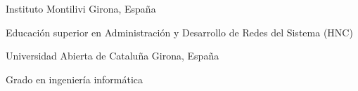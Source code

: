 \documentclass[]{awesome-cv}
\begin{document}
\vspace{8mm}
\begin{cventries}
	\vspace{2mm}
	\cventry
	{}
	{Instituto Montilivi \vspace{-5mm}}
	{Girona, España \vspace{-5mm}}
	{}
	{\begin{cvsectionnormaltext} 
		\item{Educación superior en Administración y Desarrollo de Redes del Sistema (HNC)}
	\end{cvsectionnormaltext}}

 \cventry
	{}
	{Universidad Abierta de Cataluña \vspace{-5mm}}
	{Girona, España \vspace{-5mm}}
	{}
	{\begin{cvsectionnormaltext} 
		\item{Grado en ingeniería informática}
	\end{cvsectionnormaltext}}
\end{cventries}
\end{document}
